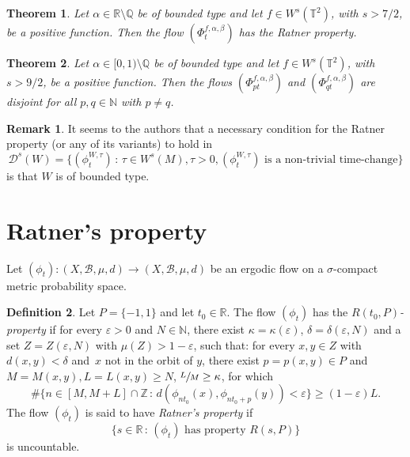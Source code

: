 \documentclass[JEP,XML,SOM,Unicode,NoEqCountersInSection]{cedram}
\let\mathcal\mathscr
\let\epsilon\varepsilon
\newcommand{\sep}{\,:\,}
\theoremstyle{definition}
\newtheorem{definition}{Definition}[section]
\newtheorem{remark}[definition]{Remark}
\theoremstyle{plain}
\newtheorem{theorem}{Theorem}
\newcommand\NN{\mathbb{N}}
\newcommand\QQ{\mathbb{Q}}
\newcommand\RR{\mathbb{R}}
\newcommand\TT{\mathbb{T}}
\newcommand\ZZ{\mathbb{Z}}
\newcommand\cB{\mathcal{B}}
\newcommand{\cD}{\mathcal D}
\begin{document}
\begin{theorem}\label{thm:main} Let $\alpha\in \RR\setminus \QQ$ be of bounded type and let $f\in W^s(\TT^2)$, with $s>7/2$, be a positive function. Then the flow
$(\Phi_t^{f,\alpha, \beta})$ has the Ratner property.
\end{theorem}

\begin{theorem}\label{thm:main2} Let $\alpha \in [0,1)\setminus \QQ$ be of bounded type and let $f\in W^s(\TT^2)$, with $s>9/2$, be a positive function. Then the flows $(\Phi_{pt}^{f,\alpha,\beta})$ and $(\Phi_{qt}^{f,\alpha,\beta})$ are disjoint for all $p,q\in \NN$ with $p\neq q$.
\end{theorem}

\begin{remark} It seems to the authors that a necessary condition for the Ratner property (or any of its variants) to hold in
\[
\cD^s(W)=\{(\phi_t^{W,\tau})\sep \tau\in W^s(M), \tau>0, (\phi_t^{W,\tau}) \text{ is a non-trivial time-change}\}
\]
is that $W$ is of bounded type.
\end{remark}

\section{Ratner's property}\label{sec:rat}
Let $(\phi_t):(X,\cB,\mu,d)\to (X,\cB,\mu,d)$ be an ergodic flow on a $\sigma$-compact metric probability space.
\begin{definition}\label{def.rat} Let $P=\{-1,1\}$ and let $t_0\in \RR$. The flow $(\phi_t)$ has the \emph{$R(t_0,P)$\nobreakdash-property} if for every $\epsilon>0$ and $N\in \NN$, there exist
$\kappa =\kappa(\epsilon)$, $\delta =\delta(\epsilon,N)$ and a set $Z = Z(\epsilon,N)$ with $\mu(Z)>1-\epsilon$,
such that:
for every $x,y\in Z$ with $d(x,y) <\delta$ and~$x$ not in the orbit of $y$, there exist $p = p(x,y)\in P$ and $M = M(x,y), L = L(x,y)\geq N$, $\sfrac{L}{M}\geq \kappa$, for which
\[
\# \{n\in [M,M+L]\cap \ZZ\sep d(\phi_{nt_0}(x), \phi_{nt_0+p}(y))<\epsilon\}\geq (1-\epsilon)L.
\]
The flow $(\phi_t)$ is said to have \emph{Ratner's property} if
\[
\{s\in \RR\sep (\phi_t)\text{ has property } R(s,P)\}
\]
is uncountable.
\end{definition}
\end{document}
